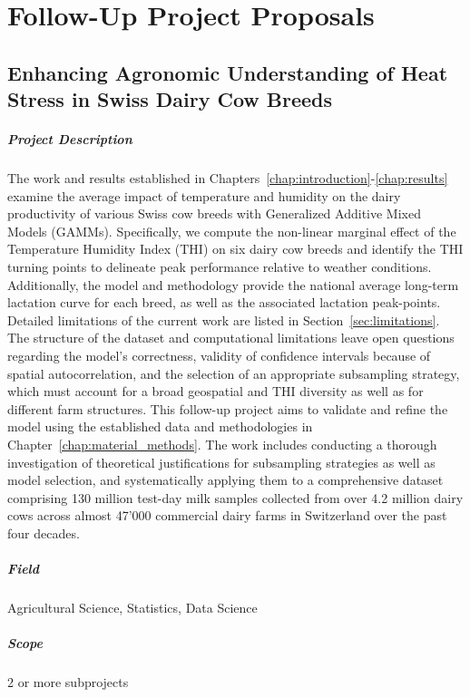 \chapter{Follow-Up Project Proposals}
\section{Enhancing Agronomic Understanding of Heat Stress in Swiss Dairy Cow Breeds}
\paragraph{Project Description} The work and results established in Chapters~\ref{chap:introduction}-\ref{chap:results} examine the average impact of temperature and humidity on the dairy productivity of various Swiss cow breeds with Generalized Additive Mixed Models (GAMMs). Specifically, we compute the non-linear marginal effect of the Temperature Humidity Index (THI) on six dairy cow breeds and identify the THI turning points to delineate peak performance relative to weather conditions. Additionally, the model and methodology provide the national average long-term lactation curve for each breed, as well as the associated lactation peak-points. Detailed limitations of the current work are listed in Section~\ref{sec:limitations}. The structure of the dataset and computational limitations leave open questions regarding the model's correctness, validity of confidence intervals because of spatial autocorrelation, and the selection of an appropriate subsampling strategy, which must account for a broad geospatial and THI diversity as well as for different farm structures. This follow-up project aims to validate and refine the model using the established data and methodologies in Chapter~\ref{chap:material_methods}. The work includes conducting a thorough investigation of theoretical justifications for subsampling strategies as well as model selection, and systematically applying them to a comprehensive dataset comprising 130 million test-day milk samples collected from over 4.2 million dairy cows across almost 47'000 commercial dairy farms in Switzerland over the past four decades.

\paragraph{Field} Agricultural Science, Statistics, Data Science
\paragraph{Scope} 2 or more subprojects
